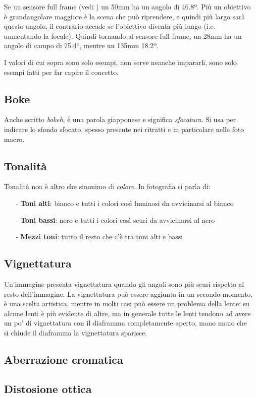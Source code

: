 Se un sensore full frame (vedi ) un 50mm ha un angolo di 46.8º. Più un obiettivo è grandangolare maggiore è la scena che può riprendere, e quindi più largo sarà questo angolo, il contrario accade se l'obiettivo diventa più lungo (i.e. aumentando la focale). Quindi tornando al sensore full frame, un 28mm ha un angolo di campo di 75.4º, mentre un 135mm 18.2º.

I valori di cui sopra sono solo esempi, non serve neanche impararli, sono solo esempi fatti per far capire il concetto.


\subsection{Boke} \label{subsec:boke}
Anche scritto \textit{bokeh}, è una parola giapponese e significa \textit{sfocatura}.\newline
Si usa per indicare lo sfondo sfocato, spesso presente nei ritratti e in particolare nelle foto macro.


\subsection{Tonalità} \label{subsec:tonalita}
Tonalità non è altro che sinonimo di \textit{colore}.\newline
In fotografia si parla di:
\begin{itemize}
    \item[-] \textbf{Toni alti}: bianco e tutti i colori così luminosi da avvicinarsi al bianco
    \item[-] \textbf{Toni bassi}: nero e tutti i colori così scuri da avvicinarsi al nero
    \item[-] \textbf{Mezzi toni}: tutto il resto che c'è tra toni alti e bassi   
\end{itemize}


\subsection{Vignettatura} \label{subsec:vignettatura}
Un'immagine presenta vignettatura quando gli angoli sono più scuri rispetto al resto dell'immagine.
La vignettatura può essere aggiunta in un secondo momento, è una scelta artistica, mentre in molti casi può essere un problema della lente: su alcune lenti è più evidente di altre, ma in generale tutte le lenti
tendono ad avere un po' di vignettatura con il diaframma completamente aperto, mano mano che si chiude il diaframma la vignettatura sparisce.


\subsection{Aberrazione cromatica} \label{subsec:abberrazione}


\subsection{Distosione ottica}
